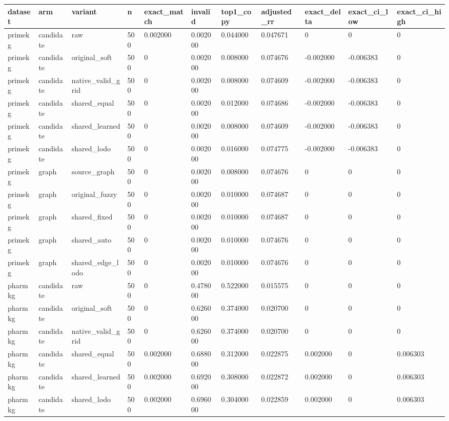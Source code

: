 \begin{tabular}{lllllllllll}
\hline
dataset & arm & variant & n & exact\_match & invalid & top1\_copy & adjusted\_rr & exact\_delta & exact\_ci\_low & exact\_ci\_high \\
\hline
primekg & candidate & raw & 500 & 0.002000 & 0.002000 & 0.044000 & 0.047671 & 0 & 0 & 0 \\
primekg & candidate & original\_soft & 500 & 0 & 0.002000 & 0.008000 & 0.074676 & -0.002000 & -0.006383 & 0 \\
primekg & candidate & native\_valid\_grid & 500 & 0 & 0.002000 & 0.008000 & 0.074609 & -0.002000 & -0.006383 & 0 \\
primekg & candidate & shared\_equal & 500 & 0 & 0.002000 & 0.012000 & 0.074686 & -0.002000 & -0.006383 & 0 \\
primekg & candidate & shared\_learned & 500 & 0 & 0.002000 & 0.008000 & 0.074609 & -0.002000 & -0.006383 & 0 \\
primekg & candidate & shared\_lodo & 500 & 0 & 0.002000 & 0.016000 & 0.074775 & -0.002000 & -0.006383 & 0 \\
primekg & graph & source\_graph & 500 & 0 & 0.002000 & 0.008000 & 0.074676 & 0 & 0 & 0 \\
primekg & graph & original\_fuzzy & 500 & 0 & 0.002000 & 0.010000 & 0.074687 & 0 & 0 & 0 \\
primekg & graph & shared\_fixed & 500 & 0 & 0.002000 & 0.010000 & 0.074687 & 0 & 0 & 0 \\
primekg & graph & shared\_auto & 500 & 0 & 0.002000 & 0.010000 & 0.074676 & 0 & 0 & 0 \\
primekg & graph & shared\_edge\_lodo & 500 & 0 & 0.002000 & 0.010000 & 0.074676 & 0 & 0 & 0 \\
pharmkg & candidate & raw & 500 & 0 & 0.478000 & 0.522000 & 0.015575 & 0 & 0 & 0 \\
pharmkg & candidate & original\_soft & 500 & 0 & 0.626000 & 0.374000 & 0.020700 & 0 & 0 & 0 \\
pharmkg & candidate & native\_valid\_grid & 500 & 0 & 0.626000 & 0.374000 & 0.020700 & 0 & 0 & 0 \\
pharmkg & candidate & shared\_equal & 500 & 0.002000 & 0.688000 & 0.312000 & 0.022875 & 0.002000 & 0 & 0.006303 \\
pharmkg & candidate & shared\_learned & 500 & 0.002000 & 0.692000 & 0.308000 & 0.022872 & 0.002000 & 0 & 0.006303 \\
pharmkg & candidate & shared\_lodo & 500 & 0.002000 & 0.696000 & 0.304000 & 0.022859 & 0.002000 & 0 & 0.006303 \\

\end{tabular}
